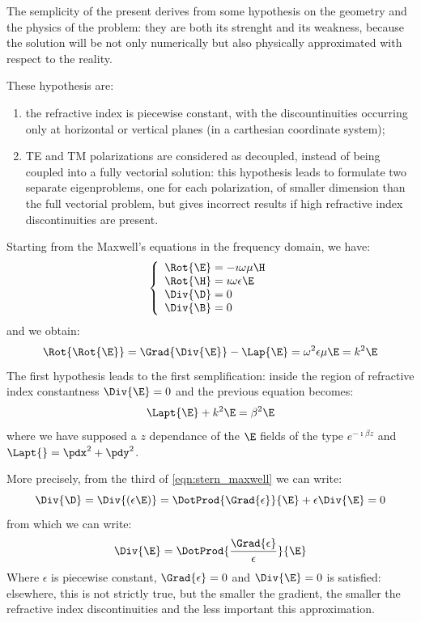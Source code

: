 The semplicity of the present derives from some hypothesis on the
geometry and the physics of the problem: they are both its strenght and
its weakness, because the solution will be not only numerically but
also physically approximated with respect to the reality.

These hypothesis are:
\begin{enumerate}
\item
  the refractive index is piecewise constant, with the
  discountinuities occurring only at horizontal or vertical planes (in
  a carthesian coordinate system);
\item
  TE and TM polarizations are considered as decoupled, instead of being
  coupled into a fully vectorial solution: this hypothesis leads to
  formulate two separate eigenproblems, one for each polarization, of
  smaller dimension than the full vectorial problem, but gives
  incorrect results if high refractive index discontinuities are
  present.
\end{enumerate}

Starting from the Maxwell's equations in the frequency domain, we
have:
\begin{equation} \label{eqn:stern_maxwell}
  \left\{ \begin{array}{l}
  \Rot{\E} = -\imath \omega \mu \H \\
  \Rot{\H} = \imath \omega \epsilon \E \\
  \Div{\D} = 0 \\
  \Div{\B} = 0
  \end{array} \right.
\end{equation}
and we obtain:
$$
\Rot{\Rot{\E}} = \Grad{\Div{\E}} - \Lap{\E} = \omega^2 \epsilon \mu
\E = k^2 \E
$$
The first hypothesis leads to the first semplification: inside the
region of refractive index constantness $\Div{\E} = 0$ and the
previous equation becomes:
\begin{equation} \label{eqn:stern_helmholtz}
\Lapt{\E} + k^2 \E = \beta^2 \E
\end{equation}
where we have supposed a $z$ dependance of the $\E$ fields of the
type $e^{- \imath \beta z}$ and $\Lapt{} = \pdx^2 + \pdy^2$.

More precisely, from the third of \eqref{eqn:stern_maxwell} we can
write:
$$
\Div{\D} = \Div{(\epsilon \E)} = \DotProd{\Grad{\epsilon}}{\E} +
\epsilon \Div{\E} = 0
$$
from which we can write:
$$
\Div{\E} = \DotProd{\frac{\Grad{\epsilon}}{\epsilon}}{\E}
$$
Where $\epsilon$ is piecewise constant, $\Grad{\epsilon} = 0$ and
$\Div{\E} = 0$ is satisfied: elsewhere, this is not strictly true, but
the smaller the gradient, the smaller the refractive index
discontinuities and the less important this approximation.

